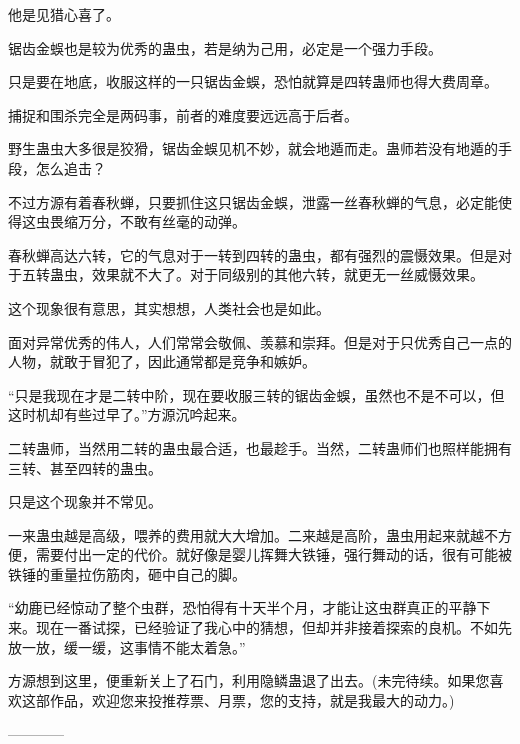 \begin{this_body}
他是见猎心喜了。

锯齿金蜈也是较为优秀的蛊虫，若是纳为己用，必定是一个强力手段。

只是要在地底，收服这样的一只锯齿金蜈，恐怕就算是四转蛊师也得大费周章。

捕捉和围杀完全是两码事，前者的难度要远远高于后者。

野生蛊虫大多很是狡猾，锯齿金蜈见机不妙，就会地遁而走。蛊师若没有地遁的手段，怎么追击？

不过方源有着春秋蝉，只要抓住这只锯齿金蜈，泄露一丝春秋蝉的气息，必定能使得这虫畏缩万分，不敢有丝毫的动弹。

春秋蝉高达六转，它的气息对于一转到四转的蛊虫，都有强烈的震慑效果。但是对于五转蛊虫，效果就不大了。对于同级别的其他六转，就更无一丝威慑效果。

这个现象很有意思，其实想想，人类社会也是如此。

面对异常优秀的伟人，人们常常会敬佩、羡慕和崇拜。但是对于只优秀自己一点的人物，就敢于冒犯了，因此通常都是竞争和嫉妒。

“只是我现在才是二转中阶，现在要收服三转的锯齿金蜈，虽然也不是不可以，但这时机却有些过早了。”方源沉吟起来。

二转蛊师，当然用二转的蛊虫最合适，也最趁手。当然，二转蛊师们也照样能拥有三转、甚至四转的蛊虫。

只是这个现象并不常见。

一来蛊虫越是高级，喂养的费用就大大增加。二来越是高阶，蛊虫用起来就越不方便，需要付出一定的代价。就好像是婴儿挥舞大铁锤，强行舞动的话，很有可能被铁锤的重量拉伤筋肉，砸中自己的脚。

“幼鹿已经惊动了整个虫群，恐怕得有十天半个月，才能让这虫群真正的平静下来。现在一番试探，已经验证了我心中的猜想，但却并非接着探索的良机。不如先放一放，缓一缓，这事情不能太着急。”

方源想到这里，便重新关上了石门，利用隐鳞蛊退了出去。(未完待续。如果您喜欢这部作品，欢迎您来投推荐票、月票，您的支持，就是我最大的动力。)

------------

\end{this_body}

